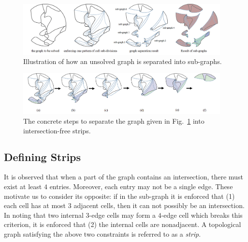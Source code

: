 \documentclass[conference]{IEEEtran}
\begin{document}
\begin{figure}[t]
\centering
\includegraphics[width =0.96\textwidth]{figures/graph_separation_2}
\caption{Illustration of how an unsolved graph is separated into sub-graphs. }\label{fig:complicated_graph}
\end{figure}

\begin{figure}[t]
\centering
\includegraphics[width=0.96\textwidth]{figures/steps}
\caption{The concrete steps to separate the graph given in Fig.~\ref{fig:complicated_graph} into intersection-free strips. }\label{fig:steps}
\end{figure}


\subsection{Defining Strips}
It is observed that when a part of the graph contains an intersection, there must exist at least $4$ entries. Moreover, each entry may not be a single edge.  
These motivate us to consider its opposite: if in the sub-graph it is enforced that (1) each cell has at most $3$ adjacent cells, then it can not possibly be an intersection. In noting that two internal $3$-edge cells may form a $4$-edge cell which breaks this criterion, it is enforced that (2) the internal cells are nonadjacent. 
A topological graph satisfying the above two constraints is referred to as a \textit{strip}. 
\end{document}

